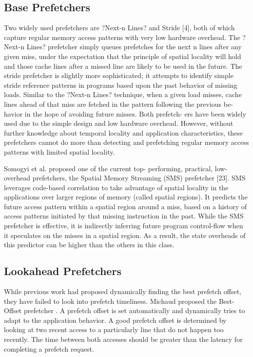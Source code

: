 \subsection{Base Prefetchers}

Two widely used prefetchers are ?Next-n Lines? \cite{nextnlines} and Stride [4], both of which capture regular memory access patterns with very low hardware overhead. The ?Next-n Lines? prefetcher simply queues prefetches for the next n lines after any given miss, under the expectation that the principle of spatial locality will hold and those cache lines after a missed line are likely to be used in the future. The stride prefetcher is slightly more sophisticated; it attempts to identify simple stride reference patterns in programs based upon the past behavior of missing loads. Similar to the ?Next-n Lines? technique, when a given load misses, cache lines ahead of that miss are fetched in the pattern following the previous be- havior in the hope of avoiding future misses. Both prefetch- ers have been widely used due to the simple design and low hardware overhead. However, without further knowledge about temporal locality and application characteristics, these prefetchers cannot do more than detecting and prefetching regular memory access patterns with limited spatial locality.

Somogyi et al. proposed one of the current top- performing, practical, low-overhead prefetchers, the Spatial Memory Streaming (SMS) prefetcher [23]. SMS leverages code-based correlation to take advantage of spatial locality in the applications over larger regions of memory (called spatial regions). It predicts the future access pattern within a spatial region around a miss, based on a history of access patterns initiated by that missing instruction in the past. While the SMS prefetcher is effective, it is indirectly inferring future program control-flow when it speculates on the misses in a spatial region. As a result, the state overheads of this predictor can be higher than the others in this class.

\subsection{Lookahead Prefetchers}



While previous work had proposed dynamically finding the best prefetch offset, they have failed to look into prefetch timeliness. Michaud proposed the Best-Offset prefetcher \cite{BOP}. A prefetch offset is set automatically and dynamically tries to adapt to the application behavior. A good prefetch offset is determined by looking at two recent access to a particularly line that do not happen too recently. The time between both accesses should be greater than the latency for completing a prefetch request. 

